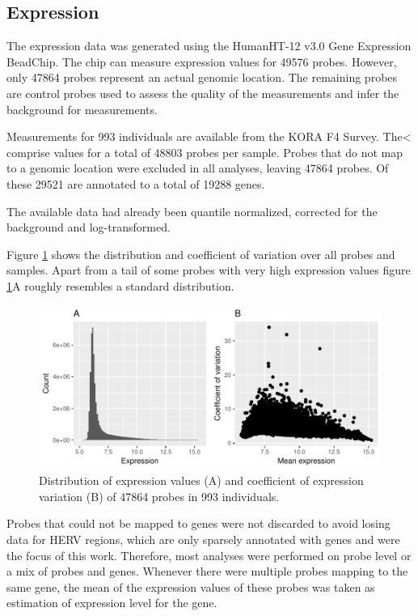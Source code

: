 \documentclass[a4paper,12pt,twoside,openright]{report}
\begin{document}
\subsection{Expression}
\label{Data:Expression}
The expression data was generated using the HumanHT-12 v3.0 Gene Expression BeadChip. The chip can measure expression values for 49576 probes. However, only 47864 probes represent an actual genomic location. The remaining probes are control probes used to assess the quality of the measurements and infer the background for measurements. 

Measurements for 993 individuals are available from the KORA F4 Survey. The< comprise values for a total of 48803 probes per sample. Probes that do not map to a genomic location were excluded in all analyses, leaving 47864 probes. Of these 29521 are annotated to a total of 19288 genes. 

The available data had already been quantile normalized, corrected for the background and log-transformed. 

Figure \ref{fig:expr.raw.hist.cov} shows the distribution and coefficient of variation over all probes and samples. Apart from a tail of some probes with very high expression values figure \ref{fig:expr.raw.hist.cov}A roughly resembles a standard distribution. 

\begin{figure}[tb]
	\includegraphics[scale = 1, keepaspectratio = true]{../figures/expr_raw_hist_cov}  
	\caption{Distribution of expression values (A) and coefficient of expression variation (B) of 47864 probes in 993 individuals.}
    \label{fig:expr.raw.hist.cov}
\end{figure}


Probes that could not be mapped to genes were not discarded to avoid losing data for HERV regions, which are only sparsely annotated with genes and were the focus of this work. Therefore, most analyses were performed on probe level or a mix of probes and genes. Whenever there were multiple probes mapping to the same gene, the mean of the expression values of these probes was taken as estimation of expression level for the gene. 
\end{document}
